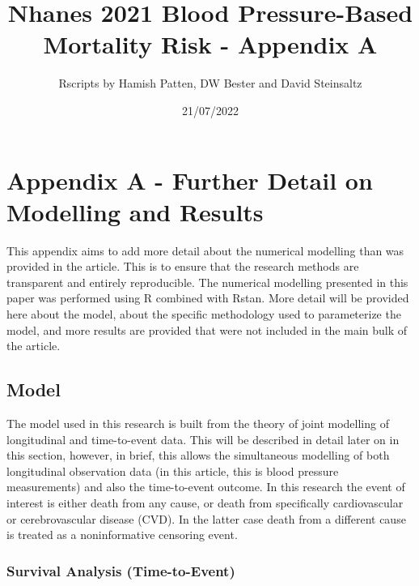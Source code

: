 \documentclass[
]{article}
\title{Nhanes 2021 Blood Pressure-Based Mortality Risk - Appendix A}
\author{Rscripts by Hamish Patten, DW Bester and David Steinsaltz}
\date{21/07/2022}
\begin{document}
\maketitle

{
\setcounter{tocdepth}{3}
\tableofcontents
}
\hypertarget{appendix-a---further-detail-on-modelling-and-results}{%
\section{Appendix A - Further Detail on Modelling and
Results}\label{appendix-a---further-detail-on-modelling-and-results}}

This appendix aims to add more detail about the numerical modelling than
was provided in the article. This is to ensure that the research methods
are transparent and entirely reproducible. The numerical modelling
presented in this paper was performed using R combined with Rstan. More
detail will be provided here about the model, about the specific
methodology used to parameterize the model, and more results are
provided that were not included in the main bulk of the article.

\hypertarget{model}{%
\subsection{Model}\label{model}}

The model used in this research is built from the theory of joint
modelling of longitudinal and time-to-event data. This will be described
in detail later on in this section, however, in brief, this allows the
simultaneous modelling of both longitudinal observation data (in this
article, this is blood pressure measurements) and also the time-to-event
outcome. In this research the event of interest is either death from any
cause, or death from specifically cardiovascular or cerebrovascular
disease (CVD). In the latter case death from a different cause is
treated as a noninformative censoring event.

\hypertarget{survival-analysis-time-to-event}{%
\subsubsection{Survival Analysis
(Time-to-Event)}\label{survival-analysis-time-to-event}}
\end{document}
